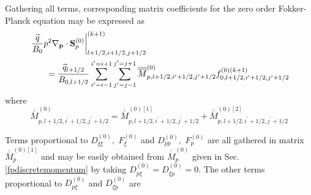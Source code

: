 Gathering all terms, corresponding matrix coefficients for the zero order
Fokker-Planck equation may be expressed as 
\begin{align}
&\left. \frac{\widetilde{q}}{B_{0}}p^{2}\nabla _{\mathbf{p}}\cdot \mathbf{S}%
_{p}^{\left( 0\right) }\right| _{l+1/2,i+1/2,j+1/2}^{(k+1)}  \notag \\
&\qquad=\frac{\widetilde{ q}_{l+1/2}}{B_{0,l+1/2}}\sum_{i^{\prime
}=i-1}^{i^{\prime }=i+1}\sum_{j^{\prime }=j-1}^{j^{\prime }=j+1}\overline{%
\overline{M}}_{p,l+1/2,i^{\prime }+1/2,j^{\prime }+1/2}^{\left( 0\right)
}f_{0,l+1/2,i^{\prime }+1/2,j^{\prime }+1/2}^{\left( 0\right) (k+1)}
\end{align}
where 
\begin{equation*}
\overline{\overline{M}}_{p,l+1/2,i^{\prime }+1/2,j^{\prime }+1/2}^{\left(
0\right) }=\overline{\overline{M}}_{p,l+1/2,i^{\prime }+1/2,j^{\prime
}+1/2}^{\left( 0\right) \left[ 1\right] }+\overline{\overline{M}}%
_{p,l+1/2,i^{\prime }+1/2,j^{\prime }+1/2}^{\left( 0\right) \left[ 2\right] }
\end{equation*}

Terms proportional to $D_{\xi \xi }^{\left( 0\right) },$ $F_{\xi }^{\left(
0\right) }$ and $D_{pp}^{\left( 0\right) },$ $F_{p}^{\left( 0\right) }$ are
all gathered in matrix $\overline{\overline{M}}_{p}^{\left( 0\right) \left[ 1%
\right] }$ and may be easily obtained from $\overline{\overline{M}}%
_{p}^{\left( 0\right) }$ given in Sec. \ref{fpdiscretemomentum} by taking $%
D_{p\xi }^{\left( 0\right) }=D_{\xi p}^{\left( 0\right) }=0.$ The other
terms proportional to $D_{p\xi }^{\left( 0\right) }$ and $D_{\xi p}^{\left(
0\right) }$ are

